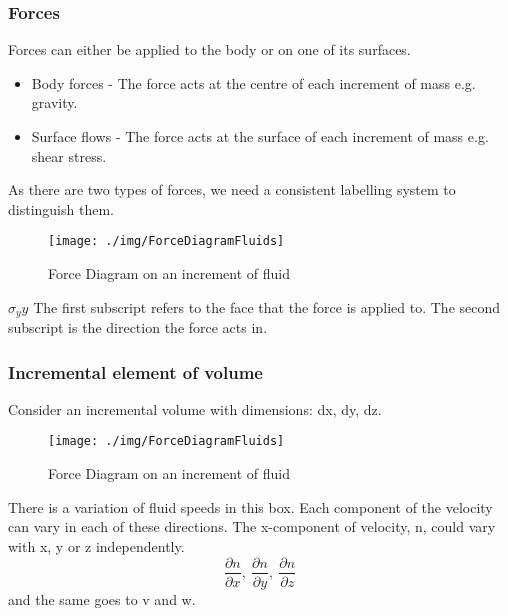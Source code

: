 \subsubsection{Forces}
Forces can either be applied to the body or on one of its surfaces.
\begin{itemize}[noitemsep]
  \item Body forces - The force acts at the centre of each increment of mass e.g. gravity.
  \item Surface flows - The force acts at the surface of each increment of mass e.g. shear stress.
\end{itemize}
As there are two types of forces, we need a consistent labelling system to distinguish them.
\begin{figure}[H]
  \centering
  \texttt{[image: ./img/ForceDiagramFluids]}
  \caption{Force Diagram on an increment of fluid}
\end{figure}
\( \sigma_yy \) The first subscript refers to the face that the force is applied to. The second subscript is the direction the force acts in.
\subsubsection{Incremental element of volume}
Consider an incremental volume with dimensions: dx, dy, dz.
\begin{figure}[H]
  \centering
  \texttt{[image: ./img/ForceDiagramFluids]}
  \caption{Force Diagram on an increment of fluid}
\end{figure}
There is a variation of fluid speeds in this box. Each component of the velocity can vary in each of these directions. The x-component of velocity, n, could vary with x, y or z independently.
\begin{equation}
  \frac{\partial n}{\partial x}, \ \frac{\partial n}{\partial y}, \ \frac{\partial n}{\partial z}
\end{equation}
and the same goes to v and w.
